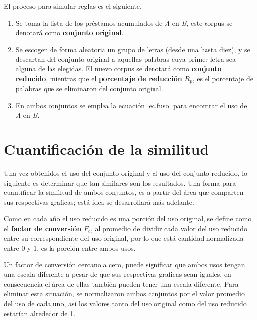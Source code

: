 El proceso para simular reglas es el siguiente. 

\begin{enumerate}
	
	\item Se toma la lista de los préstamos acumulados de \textit{A} en \textit{B}, este corpus se denotará como \textbf{conjunto original}.
	
	\item Se escogen de forma aleatoria un grupo de letras (desde una hasta diez), y se descartan del conjunto original a aquellas  palabras cuya primer letra sea alguna de las elegidas. El nuevo corpus se denotará como \textbf{conjunto reducido}, mientras que el \textbf{porcentaje de reducción} $R_{p}$, es el porcentaje de palabras que se eliminaron del conjunto original. 
	
	
	\item En ambos conjuntos se emplea la ecuación \ref{ec.fuso} para encontrar el uso de \textit{A} en \textit{B}. %
	
\end{enumerate}

\section{Cuantificación de la similitud}

Una vez obtenidos el uso del conjunto original y el uso del conjunto reducido, lo siguiente es determinar que tan similares son los resultados. Una forma para cuantificar la similitud de ambos conjuntos, es a partir del área que comparten sus respectivas graficas; está idea se desarrollará más adelante.  

Como en cada año el uso reducido es una porción del uso original, se define como el \textbf{factor de conversión} $F_{c}$, al promedio de dividir cada valor del uso reducido entre su correspondiente del uso original, por lo que está cantidad normalizada entre 0 y 1, es la porción entre ambos usos. 

Un factor de conversión cercano a cero, puede significar que ambos usos tengan una escala diferente a pesar de que sus respectivas graficas sean iguales, en consecuencia el área de ellas también pueden tener una escala diferente.  Para eliminar esta situación, se normalizaron ambos conjuntos por el valor promedio del uso de cada uno,  así los valores tanto del uso original como del uso reducido estarían alrededor de 1.  

